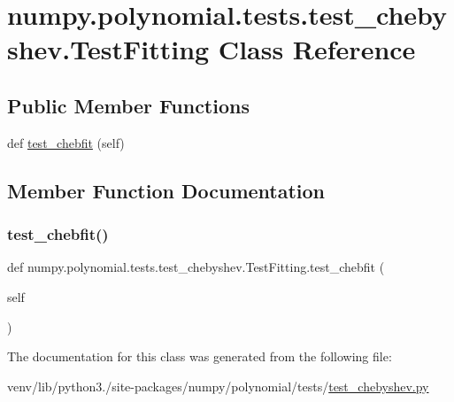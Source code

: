 \hypertarget{classnumpy_1_1polynomial_1_1tests_1_1test__chebyshev_1_1TestFitting}{}\section{numpy.\+polynomial.\+tests.\+test\+\_\+chebyshev.\+Test\+Fitting Class Reference}
\label{classnumpy_1_1polynomial_1_1tests_1_1test__chebyshev_1_1TestFitting}
\subsection*{Public Member Functions}
\begin{DoxyCompactItemize}
\item 
def \hyperlink{classnumpy_1_1polynomial_1_1tests_1_1test__chebyshev_1_1TestFitting_a5292317b561208ba48e43f5148e8715c}{test\+\_\+chebfit} (self)
\end{DoxyCompactItemize}


\subsection{Member Function Documentation}
\mbox{\label{classnumpy_1_1polynomial_1_1tests_1_1test__chebyshev_1_1TestFitting_a5292317b561208ba48e43f5148e8715c}} 
\subsubsection{\texorpdfstring{test\+\_\+chebfit()}{test\_chebfit()}}
{\footnotesize\ttfamily def numpy.\+polynomial.\+tests.\+test\+\_\+chebyshev.\+Test\+Fitting.\+test\+\_\+chebfit (\begin{DoxyParamCaption}\item[{}]{self }\end{DoxyParamCaption})}



The documentation for this class was generated from the following file\+:\begin{DoxyCompactItemize}
\item 
venv/lib/python3./site-\/packages/numpy/polynomial/tests/\hyperlink{test__chebyshev_8py}{test\+\_\+chebyshev.\+py}\end{DoxyCompactItemize}
